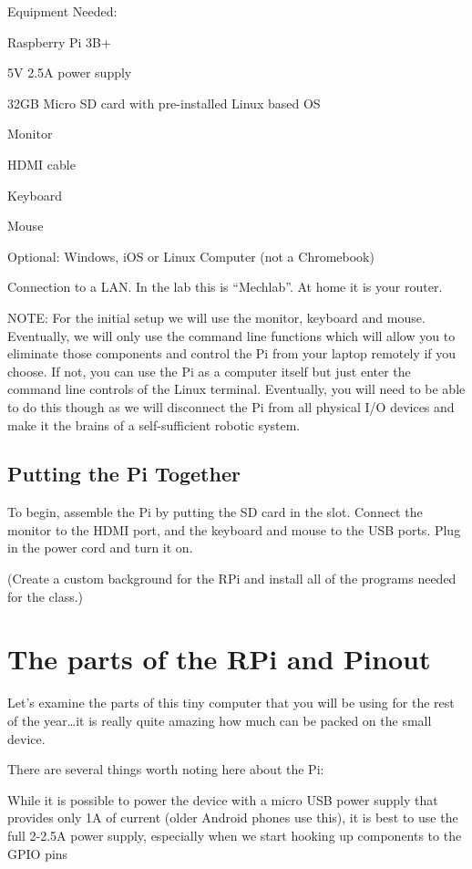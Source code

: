\documentclass[
]{book}
\begin{document}
Equipment Needed:

Raspberry Pi 3B+

5V \textbar{} 2.5A power supply

32GB Micro SD card with pre-installed Linux based OS

Monitor

HDMI cable

Keyboard

Mouse

Optional: Windows, iOS or Linux Computer (not a Chromebook)

Connection to a LAN. In the lab this is ``Mechlab''. At home it is your router.

NOTE: For the initial setup we will use the monitor, keyboard and mouse. Eventually, we will only use the command line functions which will allow you to eliminate those components and control the Pi from your laptop remotely if you choose. If not, you can use the Pi as a computer itself but just enter the command line controls of the Linux terminal. Eventually, you will need to be able to do this though as we will disconnect the Pi from all physical I/O devices and make it the brains of a self-sufficient robotic system.

\hypertarget{putting-the-pi-together}{%
\subsection{Putting the Pi Together}\label{putting-the-pi-together}}

To begin, assemble the Pi by putting the SD card in the slot. Connect the monitor to the HDMI port, and the keyboard and mouse to the USB ports. Plug in the power cord and turn it on.

(Create a custom background for the RPi and install all of the programs needed for the class.)

\hypertarget{the-parts-of-the-rpi-and-pinout}{%
\section{The parts of the RPi and Pinout}\label{the-parts-of-the-rpi-and-pinout}}

Let's examine the parts of this tiny computer that you will be using for the rest of the year\ldots it is really quite amazing how much can be packed on the small device.

There are several things worth noting here about the Pi:

While it is possible to power the device with a micro USB power supply that provides only 1A of current (older Android phones use this), it is best to use the full 2-2.5A power supply, especially when we start hooking up components to the GPIO pins
\end{document}

